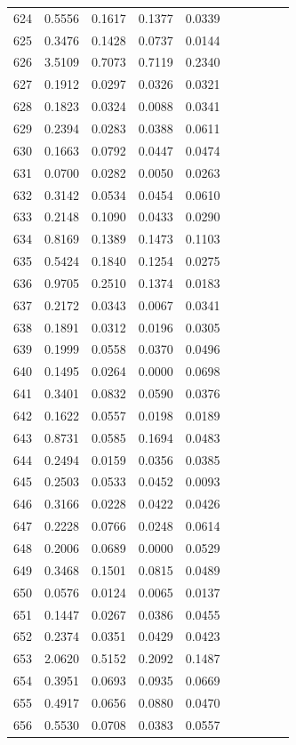\begin{table}
\begin{tabular}{cccccccccc}
624& 0.5556& 0.1617& 0.1377& 0.0339\\ 
625& 0.3476& 0.1428& 0.0737& 0.0144\\ 
626& 3.5109& 0.7073& 0.7119& 0.2340\\ 
627& 0.1912& 0.0297& 0.0326& 0.0321\\ 
628& 0.1823& 0.0324& 0.0088& 0.0341\\ 
629& 0.2394& 0.0283& 0.0388& 0.0611\\ 
630& 0.1663& 0.0792& 0.0447& 0.0474\\ 
631& 0.0700& 0.0282& 0.0050& 0.0263\\ 
632& 0.3142& 0.0534& 0.0454& 0.0610\\ 
633& 0.2148& 0.1090& 0.0433& 0.0290\\ 
634& 0.8169& 0.1389& 0.1473& 0.1103\\ 
635& 0.5424& 0.1840& 0.1254& 0.0275\\ 
636& 0.9705& 0.2510& 0.1374& 0.0183\\ 
637& 0.2172& 0.0343& 0.0067& 0.0341\\ 
638& 0.1891& 0.0312& 0.0196& 0.0305\\ 
639& 0.1999& 0.0558& 0.0370& 0.0496\\ 
640& 0.1495& 0.0264& 0.0000& 0.0698\\ 
641& 0.3401& 0.0832& 0.0590& 0.0376\\ 
642& 0.1622& 0.0557& 0.0198& 0.0189\\ 
643& 0.8731& 0.0585& 0.1694& 0.0483\\ 
644& 0.2494& 0.0159& 0.0356& 0.0385\\ 
645& 0.2503& 0.0533& 0.0452& 0.0093\\ 
646& 0.3166& 0.0228& 0.0422& 0.0426\\ 
647& 0.2228& 0.0766& 0.0248& 0.0614\\ 
648& 0.2006& 0.0689& 0.0000& 0.0529\\ 
649& 0.3468& 0.1501& 0.0815& 0.0489\\ 
650& 0.0576& 0.0124& 0.0065& 0.0137\\ 
651& 0.1447& 0.0267& 0.0386& 0.0455\\ 
652& 0.2374& 0.0351& 0.0429& 0.0423\\ 
653& 2.0620& 0.5152& 0.2092& 0.1487\\ 
654& 0.3951& 0.0693& 0.0935& 0.0669\\ 
655& 0.4917& 0.0656& 0.0880& 0.0470\\ 
656& 0.5530& 0.0708& 0.0383& 0.0557\\ 

\end{tabular}
\end{table}
